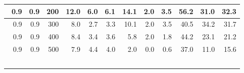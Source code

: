 \begin{longtable}{|r|r|r|r|r|r|r|r|r|r|r|r|}
    \hline \
    0.9                            & 0.9                     & 200                       & 12.0                       & 6.0                       & 6.1                       & 14.1                       & 2.0                       & 3.5                       & 56.2                      & 31.0                      & 32.3                      \\
    \hline \
    0.9                            & 0.9                     & 300                       & 8.0                       & 2.7                       & 3.3                       & 10.1                       & 2.0                       & 3.5                       & 40.5                      & 34.2                      & 31.7                      \\
    \hline \
    0.9                            & 0.9                     & 400                       & 8.4                       & 3.4                       & 3.6                       & 5.8                       & 2.0                       & 1.8                       & 44.2                      & 23.1                      & 21.2                      \\
    \hline \
    0.9                            & 0.9                     & 500                       & 7.9                       & 4.4                       & 4.0                       & 2.0                       & 0.0                       & 0.6                       & 37.0                      & 11.0                      & 15.6                      \\
    \hline \
\end{longtable}
